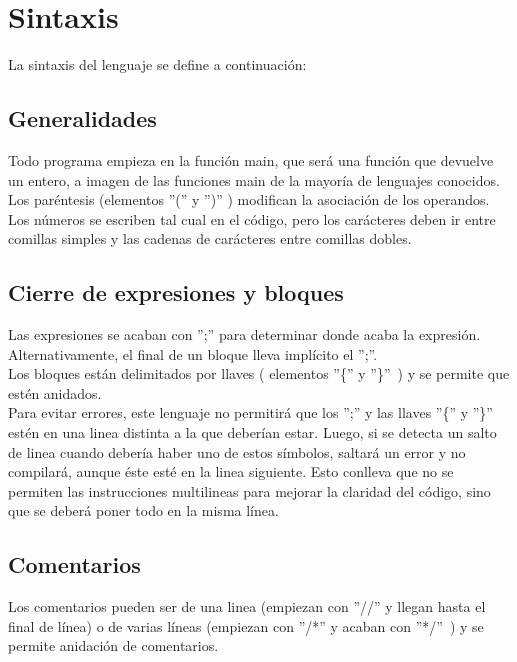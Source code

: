 \documentclass[a4paper, 12pt]{article}
\begin{document}
\section{Sintaxis}
La sintaxis del lenguaje se define a continuación:
\subsection{Generalidades}
Todo programa empieza en la función main, que será una función que devuelve un entero, a imagen de las funciones main de la mayoría de lenguajes conocidos.\\
Los paréntesis (elementos ''('' y '')'' ) modifican la asociación de los operandos.\\
Los números se escriben tal cual en el código, pero los carácteres deben ir entre comillas simples y las cadenas de carácteres entre comillas dobles.
\subsection{Cierre de expresiones y bloques}
Las expresiones se acaban con '';'' para determinar donde acaba la expresión. Alternativamente, el final de un bloque lleva implícito el '';''.\\
Los bloques están delimitados por llaves ( elementos ''\{'' y ''\}''\ ) y se permite que estén anidados.\\
Para evitar errores, este lenguaje no permitirá que los '';'' y las llaves ''\{'' y ''\}'' estén en una linea distinta a la que deberían estar. Luego, si se detecta un salto de linea cuando debería haber uno de estos símbolos, saltará un error y no compilará, aunque éste esté en la linea siguiente. Esto conlleva que no se permiten las instrucciones multilineas para mejorar la claridad del código, sino que se deberá poner todo en la misma línea.
\subsection{Comentarios}
Los comentarios pueden ser de una linea (empiezan con ''//'' y llegan hasta el final de línea) o de varias líneas (empiezan con ''/*'' y acaban con ''*/''\ ) y se permite anidación de comentarios.
\end{document}
